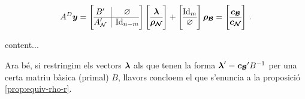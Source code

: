 \begin{equation}
	A^D\vb{y} = \left[\begin{array}{{@{}c|c@{}}}
		B'	  &	\varnothing	\\
		\hline
		A_\N' & \Id_{n-m}
	\end{array}\right]
	\left[\begin{array}{{@{}c@{}}}
			\vb{\lambda}\\
			\hline
			\vb{\rho_\N}
		\end{array}\right]
	+
	\left[\begin{array}{{@{}c@{}}}
		\Id_m\\
		\hline
		\varnothing
	\end{array}\right]
	\vb{\rho_\B}
	=
	\left[\begin{array}{{@{}c@{}}}
	\vb{c_\B}\\
	\hline
	\vb{c_\N}
	\end{array}\right]\,.
\end{equation}

\begin{defi}[Solució]
	content...
\end{defi}

Ara bé, si restringim els vectors $\boldsymbol{\lambda}$ als que tenen la forma $\boldsymbol{\lambda}'=\boldsymbol{c_{\mathcal{B}}}'B^{-1}$ per una certa matriu bàsica (primal) $B$, llavors concloem el que s'enuncia a la proposició \ref{prop:equiv-rho-r}.

